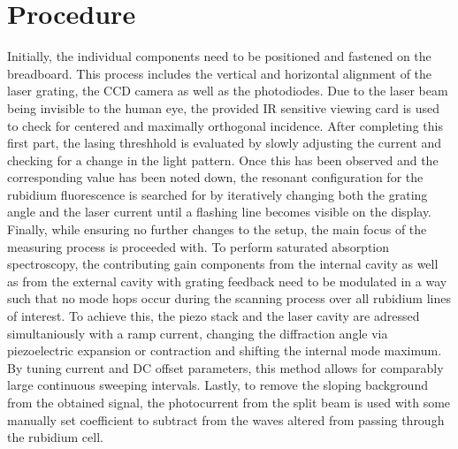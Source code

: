 \section{Procedure}
\label{sec:procedure}

Initially, the individual components need to be positioned and fastened on the breadboard. This process includes the
vertical and horizontal alignment of the laser grating, the CCD camera as well as the photodiodes.
Due to the laser beam being invisible to the human eye, the provided IR sensitive viewing card is used to check for centered
and maximally orthogonal incidence. After completing this first part, the lasing threshhold is evaluated by slowly adjusting the
current and checking for a change in the light pattern. Once this has been observed and the corresponding value has been noted down,
the resonant configuration for the rubidium fluorescence is searched for by iteratively changing both the grating angle and the
laser current until a flashing line becomes visible on the display. Finally, while ensuring no further changes to the setup, the
main focus of the measuring process is proceeded with. To perform saturated absorption spectroscopy, the contributing gain components
from the internal cavity as well as from the external cavity with grating feedback need to be modulated in a way such that
no mode hops occur during the scanning process over all rubidium lines of interest. To achieve this, the piezo stack and the laser
cavity are adressed simultaniously with a ramp current, changing the diffraction angle via piezoelectric expansion or contraction and
shifting the internal mode maximum. By tuning current and DC offset parameters, this method allows for comparably large continuous
sweeping intervals. Lastly, to remove the sloping background from the obtained signal, the photocurrent from the split beam is used
with some manually set coefficient to subtract from the waves altered from passing through the rubidium cell.
